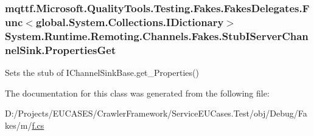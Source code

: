 \hypertarget{class_system_1_1_runtime_1_1_remoting_1_1_channels_1_1_fakes_1_1_stub_i_server_channel_sink_a8a1593c39e010de30d467ebf26b882e7}{
\subsubsection[{Properties\-Get}]{\setlength{\rightskip}{0pt plus 5cm}mqttf.\-Microsoft.\-Quality\-Tools.\-Testing.\-Fakes.\-Fakes\-Delegates.\-Func$<$global.\-System.\-Collections.\-I\-Dictionary$>$ System.\-Runtime.\-Remoting.\-Channels.\-Fakes.\-Stub\-I\-Server\-Channel\-Sink.\-Properties\-Get}}\label{class_system_1_1_runtime_1_1_remoting_1_1_channels_1_1_fakes_1_1_stub_i_server_channel_sink_a8a1593c39e010de30d467ebf26b882e7}


Sets the stub of I\-Channel\-Sink\-Base.\-get\-\_\-\-Properties()



The documentation for this class was generated from the following file\-:\begin{DoxyCompactItemize}
\item 
D\-:/\-Projects/\-E\-U\-C\-A\-S\-E\-S/\-Crawler\-Framework/\-Service\-E\-U\-Cases.\-Test/obj/\-Debug/\-Fakes/m/\hyperlink{m_2f_8cs}{f.\-cs}\end{DoxyCompactItemize}
